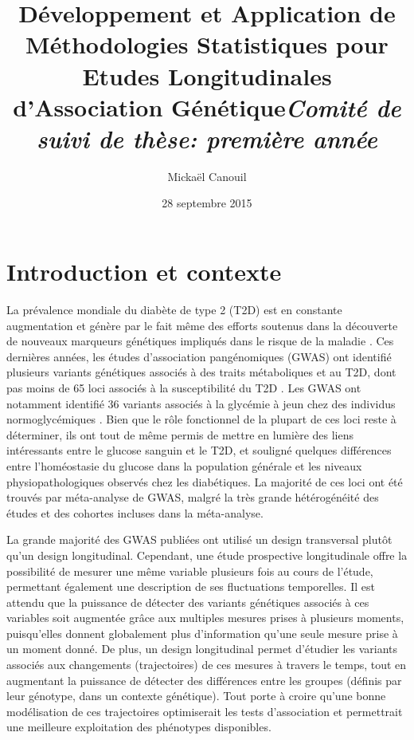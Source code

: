 \documentclass[11pt, a4paper]{article}
\title{\huge{Développement et Application de Méthodologies Statistiques pour Etudes Longitudinales d'Association Génétique}\linebreak \large{\textit{Comité de suivi de thèse: première année}}}
\date{28 septembre 2015}
\author{Mickaël Canouil}
\institute{\cmdb{G}énomique \cmdb{I}ntégrative et \cmdb{M}odélisation des \cmdb{M}aladies \cmdb{M}étaboliques \linebreak UMR 8199 (CNRS / Université de Lille 2 / Institut Pasteur de Lille)}
\begin{document}
\maketitle
\tableofcontents

\clearpage
\section{Introduction et contexte}
\par{La prévalence mondiale du diabète de type 2 (T2D) est en constante augmentation et génère par
le fait même des efforts soutenus dans la découverte de nouveaux marqueurs génétiques impliqués dans
le risque de la maladie \citep{world_health_organization_diabetes_2015}. Ces dernières années,
les études d’association pangénomiques (GWAS) ont identifié plusieurs variants génétiques associés
à des traits métaboliques et au T2D, dont pas moins de 65 loci associés à la susceptibilité du T2D \citep{morris_large-scale_2012}.
Les GWAS ont notamment identifié 36 variants associés à la glycémie à jeun chez des individus normoglycémiques \citep{dupuis_new_2010, scott_large-scale_2012}.
Bien que le rôle fonctionnel de la plupart de ces loci reste à déterminer, ils ont tout de même permis de mettre
en lumière des liens intéressants entre le glucose sanguin et le T2D, et souligné quelques différences entre
l’homéostasie du glucose dans la population générale et les niveaux physiopathologiques observés chez les diabétiques.
La majorité de ces loci ont été trouvés par méta-analyse de GWAS, malgré la très grande hétérogénéité
des études et des cohortes incluses dans la méta-analyse.}

\par{La grande majorité des GWAS publiées ont utilisé un design transversal plutôt qu’un design longitudinal.
Cependant, une étude prospective longitudinale offre la possibilité de mesurer une même variable plusieurs
fois au cours de l’étude, permettant également une description de ses fluctuations temporelles.
Il est attendu que la puissance de détecter des variants génétiques associés à ces variables soit augmentée
grâce aux multiples mesures prises à plusieurs moments, puisqu’elles donnent globalement plus d’information
qu’une seule mesure prise à un moment donné. De plus, un design longitudinal permet d’étudier les variants
associés aux changements (trajectoires) de ces mesures à travers le temps, tout en augmentant la puissance
de détecter des différences entre les groupes (définis par leur génotype, dans un contexte génétique).
Tout porte à croire qu’une bonne modélisation de ces trajectoires optimiserait les tests d’association et
permettrait une meilleure exploitation des phénotypes disponibles.}
\end{document}
